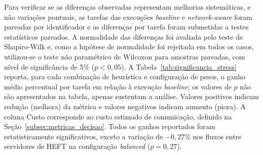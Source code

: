 \documentclass[12pt]{article}
\begin{document}
Para verificar se as diferenças observadas representam melhorias sistemáticas, e não variações pontuais, as tarefas das execuções \textit{baseline} e \textit{network-aware} foram pareadas por identificador e as diferenças por tarefa foram submetidas a testes estatísticos pareados.
%
A normalidade das diferenças foi avaliada pelo teste de Shapiro-Wilk e, como a hipótese de normalidade foi rejeitada em todos os casos, utilizou-se o teste não paramétrico de Wilcoxon para amostras pareadas, com nível de significância de 5\% ($p < 0{,}05$).
%
A Tabela~\ref{tab:significancia_stress} reporta, para cada combinação de heurística e configuração de pesos, o ganho médio percentual por tarefa em relação à execução \textit{baseline}; os valores de $p$ não são apresentados na tabela, apenas sustentam a análise.
%
Valores positivos indicam redução (melhora) da métrica e valores negativos indicam aumento (piora). A coluna Custo corresponde ao custo estimado de comunicação, definido na Seção~\ref{subsec:metricas_decisao}.
%
Todos os ganhos reportados foram estatisticamente significativos, exceto a variação de $-0{,}27\%$ nos fluxos entre servidores de HEFT na configuração \textit{balanced} ($p = 0{,}27$).
\end{document}
